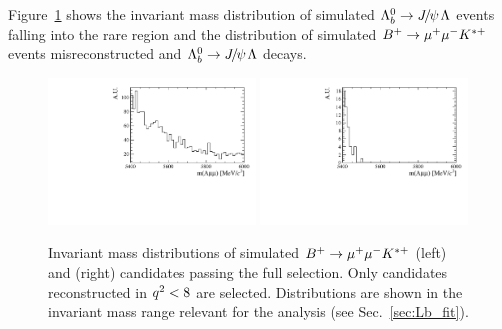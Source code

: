 Figure~\ref{fig:peakingBkgs} shows the invariant mass distribution of simulated $\Lb\ra\jpsi\Lz$
events falling into the rare \qsq region and the distribution of simulated $B^{+} \rightarrow{\ensuremath{\mu^+\mu^-}} K^{*+}$
events misreconstructed and $\Lb\ra\jpsi\Lz$ decays.
%
\begin{figure}
\centering
\includegraphics[width=0.49\textwidth]{Lmumu/figs/Bu2Kstplus_mass.pdf}
\includegraphics[width=0.49\textwidth]{Lmumu/figs/JpsiL_leakage_mass.pdf}
\caption{ Invariant mass distributions of simulated $B^{+} \rightarrow{\ensuremath{\mu^+\mu^-}} K^{*+}$ (left)
and \Lb\to\jpsi\Lz (right) candidates passing the full selection. Only \Lb\to\jpsi\Lz
candidates reconstructed in ${q^2} < 8$ \gevgevcccc are selected.
Distributions are shown in the invariant mass range relevant for the analysis 
(see Sec.~\ref{sec:Lb_fit}). }
\label{fig:peakingBkgs}
\end{figure}

